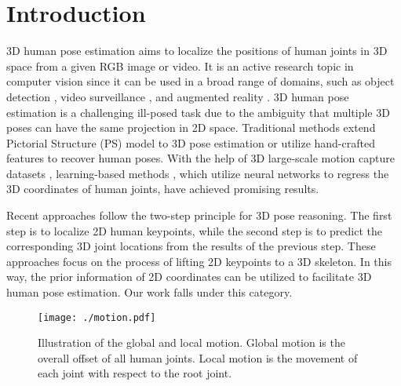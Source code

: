 \documentclass[sigconf]{acmart}
\begin{document}



\maketitle

\section{Introduction}
3D human pose estimation aims to localize the positions of human joints in 3D space from a given RGB image or video. It is an active research topic in computer vision since it can be used in a broad range of domains, such as object detection \cite{wan2020faster}, video surveillance \cite{liu2018pose}, and augmented reality \cite{lin2010augmented}. 3D human pose estimation is a challenging ill-posed task due to the ambiguity that multiple 3D poses can have the same projection in 2D space. Traditional methods \cite{belagiannis20143d,andriluka2009pictorial,agarwal20043d} extend Pictorial Structure (PS) model to 3D pose estimation or utilize hand-crafted features to recover human poses.  With the help of 3D large-scale motion capture datasets \cite{ionescu2013human3,sigal2010humaneva}, learning-based methods \cite{fabbri2020compressed,sun2017compositional,pavlakos2017coarse}, which utilize neural networks to regress the 3D coordinates of human joints, have achieved promising results.

Recent approaches \cite{martinez2017simple,zhao2019semantic,jllo20193d} follow the two-step principle for 3D pose reasoning. The first step is to localize 2D human keypoints, while the second step is to predict the corresponding 3D joint locations from the results of the previous step. These approaches focus on the process of lifting 2D keypoints to a 3D skeleton. In this way, the prior information of 2D coordinates can be utilized to facilitate 3D human pose estimation. Our work falls under this category. 

\begin{figure}
  \centering
  \texttt{[image: ./motion.pdf]}
  \vspace{-0.3cm}
  \caption{Illustration of the global and local motion. Global motion is the overall offset of all human joints. Local motion is the movement of each joint with respect to the root joint.}
  \vspace{-0.3cm}
  \label{img10}
\end{figure}
\end{document}

